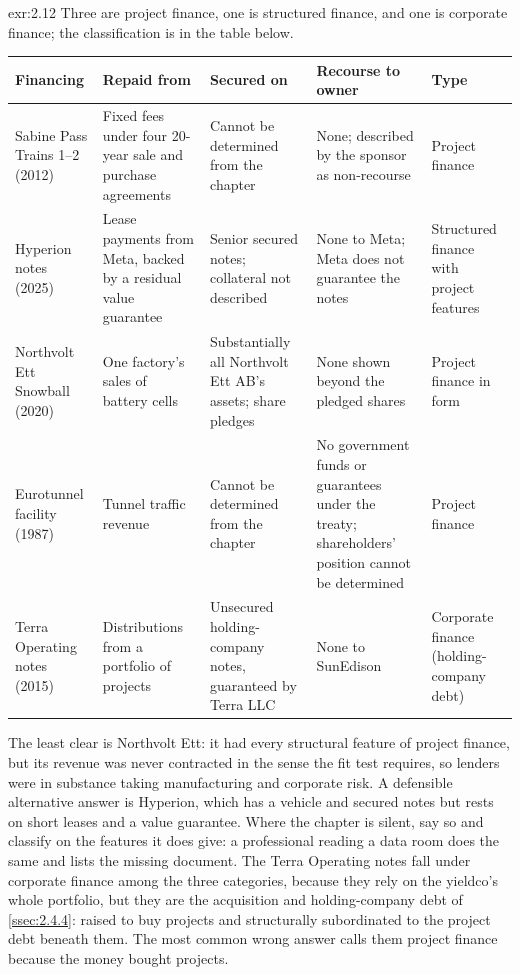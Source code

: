 \begin{solution}{exr:2.12}
Three are project finance, one is structured finance, and one is corporate finance; the classification is in the table below.

\begin{center}
\small
\begin{tabularx}{\linewidth}{@{}>{\raggedright\arraybackslash}p{22mm} L L L >{\raggedright\arraybackslash}p{16mm}@{}}
\toprule
Financing & Repaid from & Secured on & Recourse to owner & Type\\
\midrule
Sabine Pass Trains 1--2 (2012) & Fixed fees under four 20-year sale and purchase agreements & Cannot be determined from the chapter & None; described by the sponsor as non-recourse & Project finance\\
Hyperion notes (2025) & Lease payments from Meta, backed by a residual value guarantee & Senior secured notes; collateral not described & None to Meta; Meta does not guarantee the notes & Structured finance with project features\\
Northvolt Ett Snowball (2020) & One factory's sales of battery cells & Substantially all Northvolt Ett AB's assets; share pledges & None shown beyond the pledged shares & Project finance in form\\
Eurotunnel facility (1987) & Tunnel traffic revenue & Cannot be determined from the chapter & No government funds or guarantees under the treaty; shareholders' position cannot be determined & Project finance\\
Terra Operating notes (2015) & Distributions from a portfolio of projects & Unsecured holding-company notes, guaranteed by Terra LLC & None to SunEdison & Corporate finance (holding-company debt)\\
\bottomrule
\end{tabularx}
\end{center}

The least clear is Northvolt Ett: it had every structural feature of project finance, but its revenue was never contracted in the sense the fit test requires, so lenders were in substance taking manufacturing and corporate risk. A defensible alternative answer is Hyperion, which has a vehicle and secured notes but rests on short leases and a value guarantee. Where the chapter is silent, say so and classify on the features it does give: a professional reading a data room does the same and lists the missing document. The Terra Operating notes fall under corporate finance among the three categories, because they rely on the yieldco's whole portfolio, but they are the acquisition and holding-company debt of \cref{ssec:2.4.4}: raised to buy projects and structurally subordinated to the project debt beneath them. The most common wrong answer calls them project finance because the money bought projects.
\end{solution}

